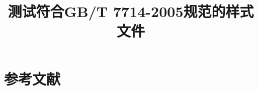 \documentclass[adobefonts]{ctexart}
\begin{document}
\title{测试符合GB/T 7714-2005规范的{\BibTeX}样式文件}

\section{参考文献}

\nocite{*}

\end{document}
